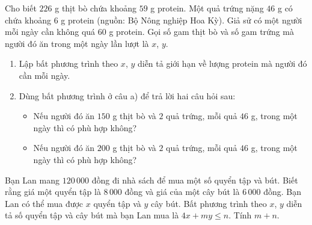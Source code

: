 \begin{bt}%
	Cho biết $226$ g thịt bò chứa khoảng $59$ g protein. Một quả trứng nặng $46$ g có chứa khoảng $6$ g protein (nguồn: Bộ Nông nghiệp Hoa Kỳ). Giả sử có một người mỗi ngày cần không quá $60$ g protein. Gọi số gam thịt bò và số gam trứng mà người đó ăn trong một ngày lần lượt là $x$, $y$.
	\begin{enumerate}
		\item Lập bất phương trình theo $x$, $y$ diễn tả giới hạn về lượng protein mà người đó cần mỗi ngày.
		\item Dùng bất phương trình ở câu a) để trả lời hai câu hỏi sau: 
		\begin{itemize}
			\item Nếu người đó ăn $150$ g thịt bò và $2$ quả trứng, mỗi quả $46$ g, trong một ngày thì có phù hợp không?
			\item Nếu người đó ăn $200$ g thịt bò và $2$ quả trứng, mỗi quả $46$ g, trong một ngày thì có phù hợp không?
		\end{itemize}
	\end{enumerate}
\end{bt}

\begin{bt}%
Bạn Lan mang $120\,000$ đồng đi nhà sách để mua một số quyển tập và bút. Biết rằng giá một quyển tập là $8\,000$ đồng và giá của một cây bút là $6\,000$ đồng. Bạn Lan có thể mua được $x$ quyển tập và $y$ cây bút. Bất phương trình theo $x$, $y$ diễn tả số quyển tập và cây bút mà bạn Lan mua là $4x+m y \leq n$. Tính $m+n$.
\par{}
\end{bt}

